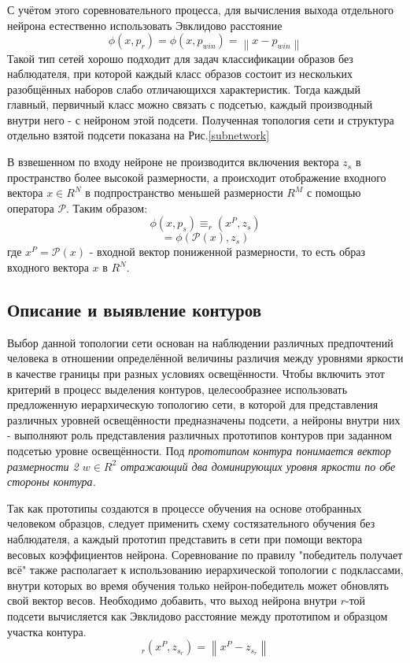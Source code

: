 \documentclass[a4paper,12pt]{report}
\begin{document}
С учётом этого соревновательного процесса, для вычисления выхода отдельного нейрона естественно использовать Эвклидово расстояние
\begin{equation}
\phi(x,p_r)=\phi(x,p_{win})=\left\|x-p_{win}\right\|
\end{equation}
Такой тип сетей хорошо подходит для задач классификации образов без наблюдателя, при которой каждый класс образов состоит из нескольких разобщённых наборов слабо отличающихся характеристик. Тогда каждый главный, первичный класс можно связать с подсетью, каждый производный внутри него - с нейроном этой подсети. Полученная топология сети и структура отдельно взятой подсети показана на Рис.\ref{subnetwork}

В взвешенном по входу нейроне не производится включения вектора $z_s$ в пространство более высокой размерности, а происходит отображение входного вектора $x\in R^N$ в подпространство меньшей размерности $R^M$ с помощью оператора $\mathcal{P}$. Таким образом:
\begin{equation}
\phi(x,p_s)\equiv_r(x^P,z_s)
\end{equation}
\begin{equation}	
=\phi(\mathcal{P}(x),z_s)
\end{equation}
где $x^P=\mathcal{P}(x)$ - входной вектор пониженной размерности, то есть образ входного вектора $x$ в $ R^N$.

\subsection{Описание и выявление контуров}

Выбор данной топологии сети основан на наблюдении различных пред\-поч\-те\-ний человека в отношении определённой величины различия между уровнями яркости в качестве границы при разных условиях освещённости. Чтобы включить этот критерий в процесс выделения контуров, целесообразнее использовать предложенную иерархическую топологию сети, в которой для представления различных уровней освещённости предназначены подсети, а нейроны внутри них - выполняют роль представления различных прототипов контуров при заданном подсетью уровне освещённости. Под \itshape прототипом контура \normalfont понимается вектор размерности 2 $w\in R^2$ отражающий два доминирующих уровня яркости по обе стороны контура.

Так как прототипы создаются в процессе обучения на основе отобранных человеком образцов, следует применить схему состязательного обучения без наблюдателя, а каждый прототип представить в сети при помощи вектора весовых коэффициентов нейрона. Соревнование по правилу "победитель получает всё"  также располагает к использованию иерархической топологии с подклассами, внутри которых во время обучения только нейрон-победитель может обновлять свой вектор весов. Необходимо добавить, что выход нейрона внутри $r$-той подсети вычисляется как Эвклидово расстояние между прототипом и образцом участка контура.
\begin{equation}
_r(x^P,z_{s_r})=\left\|x^P-z_{s_r}\right\|
\end{equation}
\end{document}
